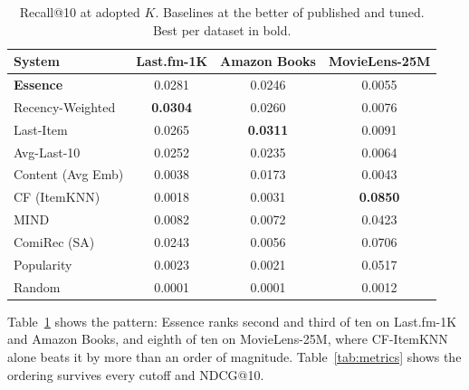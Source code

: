 \documentclass[runningheads]{llncs}
\begin{document}
\begin{table}[t]
\caption{Recall@10 at adopted $K$. Baselines at the better of published and tuned.
Best per dataset in bold.}\label{tab:main}
\centering
\small
\begin{tabular}{@{}lccc@{}}
\toprule
System & Last.fm-1K & Amazon Books & MovieLens-25M \\
\midrule
\textbf{Essence} & 0.0281 & 0.0246 & 0.0055 \\
Recency-Weighted & \textbf{0.0304} & 0.0260 & 0.0076 \\
Last-Item & 0.0265 & \textbf{0.0311} & 0.0091 \\
Avg-Last-10 & 0.0252 & 0.0235 & 0.0064 \\
Content (Avg Emb) & 0.0038 & 0.0173 & 0.0043 \\
CF (ItemKNN) & 0.0018 & 0.0031 & \textbf{0.0850} \\
MIND & 0.0082 & 0.0072 & 0.0423 \\
ComiRec (SA) & 0.0243 & 0.0056 & 0.0706 \\
Popularity & 0.0023 & 0.0021 & 0.0517 \\
Random & 0.0001 & 0.0001 & 0.0012 \\
\bottomrule
\end{tabular}
\end{table}

Table~\ref{tab:main} shows the pattern: Essence ranks second and third of ten on
Last.fm-1K and Amazon Books, and eighth of ten on MovieLens-25M, where CF-ItemKNN alone
beats it by more than an order of magnitude. Table~\ref{tab:metrics} shows the ordering
survives every cutoff and NDCG@10.
\end{document}
